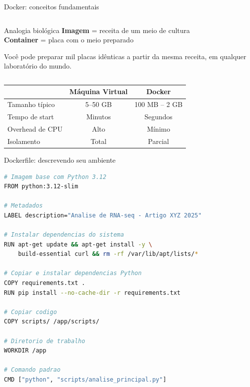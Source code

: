 \begin{frame}[fragile, shrink=15]{Docker: conceitos fundamentais}
\begin{columns}

\vspace{0.2cm}

\begin{exampleblock}{Analogia biológica}
\textbf{Imagem} = receita de um meio de cultura\\
\textbf{Container} = placa com o meio preparado

Você pode preparar mil placas idênticas a partir da mesma receita, em qualquer laboratório do mundo.
\end{exampleblock}
\end{columns}

\vspace{0.3cm}
\begin{center}
\begin{tabular}{lcc}
\toprule
& \textbf{Máquina Virtual} & \textbf{Docker} \\
\midrule
Tamanho típico & 5--50 GB & 100 MB -- 2 GB \\
Tempo de start & Minutos & Segundos \\
Overhead de CPU & Alto & Mínimo \\
Isolamento & Total & Parcial \\
\bottomrule
\end{tabular}
\end{center}
\end{frame}

\begin{frame}[fragile, shrink=15]{Dockerfile: descrevendo seu ambiente}
\begin{lstlisting}[language=bash, caption=Exemplo de Dockerfile para análise bioinformática, basicstyle=\ttfamily\footnotesize]
# Imagem base com Python 3.12
FROM python:3.12-slim

# Metadados
LABEL description="Analise de RNA-seq - Artigo XYZ 2025"

# Instalar dependencias do sistema
RUN apt-get update && apt-get install -y \
    build-essential curl && rm -rf /var/lib/apt/lists/*

# Copiar e instalar dependencias Python
COPY requirements.txt .
RUN pip install --no-cache-dir -r requirements.txt

# Copiar codigo
COPY scripts/ /app/scripts/

# Diretorio de trabalho
WORKDIR /app

# Comando padrao
CMD ["python", "scripts/analise_principal.py"]
\end{lstlisting}
\end{frame}

